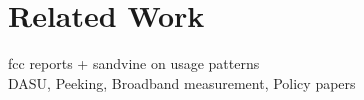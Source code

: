 \section{Related Work}
\label{related}
fcc reports + sandvine on usage patterns\\
DASU, Peeking, Broadband measurement, Policy papers\\
